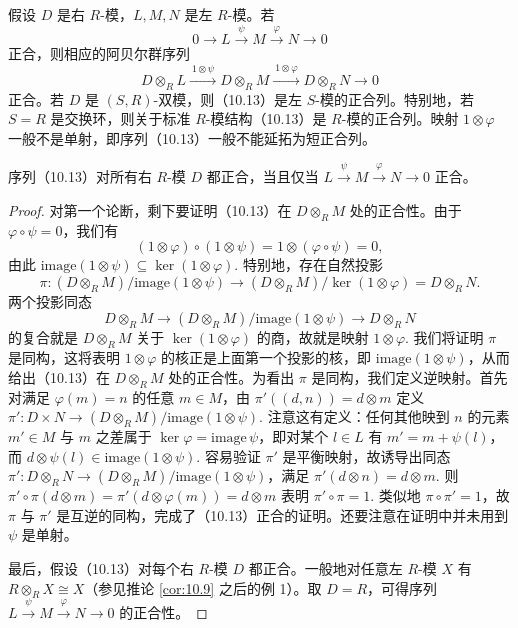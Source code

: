 \begin{theorem}\label{thm:10.39}
假设 \(D\) 是右 \(R\)-模，\(L, M, N\) 是左 \(R\)-模。若
\[
0 \longrightarrow L \xrightarrow{\ \psi\ } M \xrightarrow{\ \varphi\ } N \longrightarrow 0
\]
正合，则相应的阿贝尔群序列
\begin{equation}
D \otimes_R L \xrightarrow{\ 1 \otimes \psi\ } D \otimes_R M \xrightarrow{\ 1 \otimes \varphi\ } D \otimes_R N \longrightarrow 0 \tag{10.13}
\end{equation}
正合。若 \(D\) 是 \((S, R)\)-双模，则（10.13）是左 \(S\)-模的正合列。特别地，若 \(S = R\) 是交换环，则关于标准 \(R\)-模结构（10.13）是 \(R\)-模的正合列。映射 \(1 \otimes \varphi\) 一般不是单射，即序列（10.13）一般不能延拓为短正合列。

序列（10.13）对所有右 \(R\)-模 \(D\) 都正合，当且仅当 \(L \xrightarrow{\psi} M \xrightarrow{\varphi} N \to 0\) 正合。
\end{theorem}

\begin{proof}
对第一个论断，剩下要证明（10.13）在 \(D \otimes_R M\) 处的正合性。由于 \(\varphi \circ \psi = 0\)，我们有
\[
(1 \otimes \varphi) \circ (1 \otimes \psi) = 1 \otimes (\varphi \circ \psi) = 0,
\]
由此 \(\mathrm{image}(1 \otimes \psi) \subseteq \ker(1 \otimes \varphi)\). 特别地，存在自然投影
\[
\pi : (D \otimes_R M)/\mathrm{image}(1 \otimes \psi) \longrightarrow (D \otimes_R M)/\ker(1 \otimes \varphi) = D \otimes_R N.
\]
两个投影同态
\[
D \otimes_R M \longrightarrow (D \otimes_R M)/\mathrm{image}(1 \otimes \psi) \longrightarrow D \otimes_R N
\]
的复合就是 \(D \otimes_R M\) 关于 \(\ker(1 \otimes \varphi)\) 的商，故就是映射 \(1 \otimes \varphi\). 我们将证明 \(\pi\) 是同构，这将表明 \(1 \otimes \varphi\) 的核正是上面第一个投影的核，即 \(\mathrm{image}(1 \otimes \psi)\)，从而给出（10.13）在 \(D \otimes_R M\) 处的正合性。为看出 \(\pi\) 是同构，我们定义逆映射。首先对满足 \(\varphi(m) = n\) 的任意 \(m \in M\)，由 \(\pi'((d, n)) = d \otimes m\) 定义 \(\pi' : D \times N \to (D \otimes_R M)/\mathrm{image}(1 \otimes \psi)\). 注意这有定义：任何其他映到 \(n\) 的元素 \(m' \in M\) 与 \(m\) 之差属于 \(\ker\varphi = \mathrm{image}\,\psi\)，即对某个 \(l \in L\) 有 \(m' = m+\psi(l)\)，而 \(d \otimes \psi(l) \in \mathrm{image}(1 \otimes \psi)\). 容易验证 \(\pi'\) 是平衡映射，故诱导出同态 \(\pi' : D \otimes_R N \to (D \otimes_R M)/\mathrm{image}(1 \otimes \psi)\)，满足 \(\pi'(d \otimes n) = d \otimes m\). 则 \(\pi' \circ \pi(d \otimes m) = \pi'(d \otimes \varphi(m)) = d \otimes m\) 表明 \(\pi' \circ \pi = 1\). 类似地 \(\pi \circ \pi' = 1\)，故 \(\pi\) 与 \(\pi'\) 是互逆的同构，完成了（10.13）正合的证明。还要注意在证明中并未用到 \(\psi\) 是单射。

最后，假设（10.13）对每个右 \(R\)-模 \(D\) 都正合。一般地对任意左 \(R\)-模 \(X\) 有 \(R \otimes_R X \cong X\)（参见推论 \ref{cor:10.9} 之后的例 1）。取 \(D = R\)，可得序列 \(L \xrightarrow{\psi} M \xrightarrow{\varphi} N \to 0\) 的正合性。
\end{proof}

